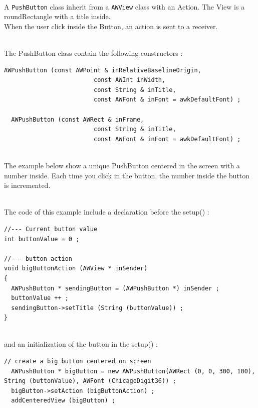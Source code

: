 \documentclass[a4paper,11pt]{extarticle}
\begin{document}
~\\ A \texttt{PushButton} class inherit from a \texttt{AWView} class with an Action. The View is a roundRectangle with a title inside.
~\\ When the user click inside the Button, an action is sent to a receiver.

~\\ The PushButton class contain the following constructors :

\begin{lstlisting}[language=Arduinonl]
  AWPushButton (const AWPoint & inRelativeBaselineOrigin,
                         const AWInt inWidth,
                         const String & inTitle,
                         const AWFont & inFont = awkDefaultFont) ;
  
  AWPushButton (const AWRect & inFrame,
                         const String & inTitle,
                         const AWFont & inFont = awkDefaultFont) ;
\end{lstlisting}

~\\ The example below show a unique PushButton centered in the screen with a number inside. Each time you click in the button, the number inside the button is incremented.

~\\ The code of this example include a declaration before the setup() :

\begin{lstlisting}[language=Arduinonl]
//--- Current button value
int buttonValue = 0 ;

//--- button action
void bigButtonAction (AWView * inSender)
{
  AWPushButton * sendingButton = (AWPushButton *) inSender ;
  buttonValue ++ ;
  sendingButton->setTitle (String (buttonValue)) ;
}
\end{lstlisting}

~\\ and an initialization of the button in the setup() :

\begin{lstlisting}[language=Arduinonl]
 // create a big button centered on screen
  AWPushButton * bigButton = new AWPushButton(AWRect (0, 0, 300, 100), String (buttonValue), AWFont (ChicagoDigit36)) ;
  bigButton->setAction (bigButtonAction) ;
  addCenteredView (bigButton) ;
\end{lstlisting}
\end{document}
